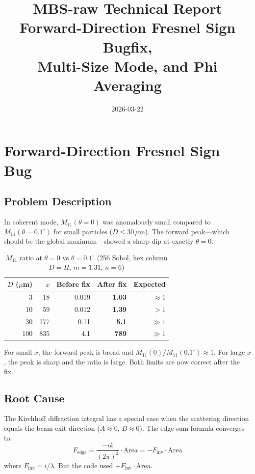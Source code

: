 \documentclass[11pt,a4paper]{article}
\title{\textbf{MBS-raw Technical Report}\\[6pt]
\large Forward-Direction Fresnel Sign Bugfix,\\
Multi-Size Mode, and Phi Averaging}
\author{}
\date{2026-03-22}
\begin{document}
\maketitle
\tableofcontents
\newpage

\section{Forward-Direction Fresnel Sign Bug}

\subsection{Problem Description}

In coherent mode, $M_{11}(\theta{=}0)$ was anomalously small compared to $M_{11}(\theta{=}0.1^\circ)$
for small particles ($D \leq 30\,\mu$m). The forward peak—which should be the global maximum—showed
a sharp dip at exactly $\theta=0$.

\begin{table}[h]\centering
\caption{$M_{11}$ ratio at $\theta=0$ vs $\theta=0.1^\circ$ (256 Sobol, hex column $D{=}H$, $m{=}1.31$, $n{=}6$)}
\label{tab:ratio}
\begin{tabular}{rrrrr}
\toprule
$D$ ($\mu$m) & $x$ & Before fix & After fix & Expected \\
\midrule
3   & 18  & 0.019  & \textbf{1.03} & $\approx 1$ \\
10  & 59  & 0.012  & \textbf{1.39} & $> 1$ \\
30  & 177 & 0.11   & \textbf{5.1}  & $\gg 1$ \\
100 & 835 & 4.1    & \textbf{789}  & $\gg 1$ \\
\bottomrule
\end{tabular}
\end{table}

For small $x$, the forward peak is broad and $M_{11}(0)/M_{11}(0.1^\circ) \approx 1$.
For large $x$, the peak is sharp and the ratio is large. Both limits are now correct after the fix.

\subsection{Root Cause}

The Kirchhoff diffraction integral has a special case when the scattering direction equals the
beam exit direction ($A \approx 0$, $B \approx 0$). The edge-sum formula converges to:
\[
F_\text{edge} = \frac{-ik}{(2\pi)^2} \cdot \text{Area} = -F_\text{inv} \cdot \text{Area}
\]
where $F_\text{inv} = i/\lambda$. But the code used $+F_\text{inv} \cdot \text{Area}$.
\end{document}
